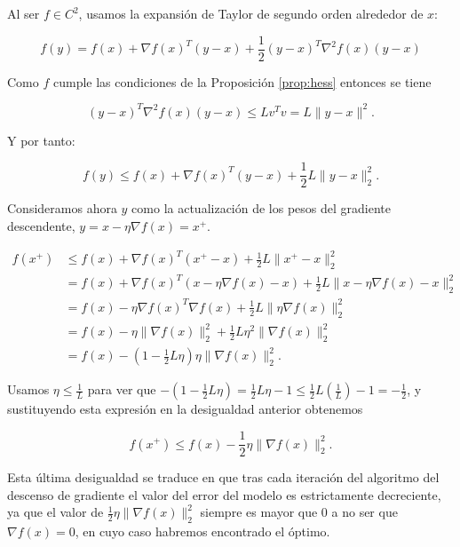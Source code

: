 Al ser $f \in C^2$, usamos la expansión de Taylor de segundo orden alrededor de $x$: 

\begin{equation*}
	f(y) = f(x) + \nabla f(x)^T (y-x) + \frac{1}{2} (y-x)^T \nabla^2 f(x) (y-x) 
\end{equation*}

Como $f$ cumple las condiciones de la Proposición \ref{prop:hess} entonces se tiene

\begin{equation*} 
	(y-x)^T\nabla ^2f(x)(y-x) \leq Lv^Tv = L \|y-x \|^2.
\end{equation*}

Y por tanto:

\begin{equation*}
    f(y) \leq f(x) + \nabla f(x)^T(y-x) + \frac{1}{2}L \|y - x \|^2_2.
\end{equation*}

Consideramos ahora $y$ como la actualización de los pesos del gradiente descendente, $y=x - \eta \nabla f(x)=x^+$. 


\begin{align*}
    f(x^+) &\leq f(x) + \nabla f(x)^T(x^+-x) + \frac{1}{2}L \|x^+ - x \|^2_2 \\
    &= f(x) + \nabla f(x)^T(x - \eta \nabla f(x) -x) + \frac{1}{2}L \|x - \eta \nabla f(x) - x \|^2_2 \\
    &= f(x) - \eta \nabla f(x)^T \nabla f(x) + \frac{1}{2} L \| \eta \nabla f(x) \|^2_2 \\
    &= f(x) - \eta \| \nabla f(x) \|^2_2 + \frac{1}{2} L \eta^2 \| \nabla f(x) \|^2_2 \\
    &= f(x) - (1- \frac{1}{2}L \eta) \eta \| \nabla f(x) \|^2_2.
\end{align*}

Usamos $\eta \leq \frac{1}{L}$ para ver que $-(1-\frac{1}{2}L \eta)= \frac{1}{2} L \eta - 1 \leq \frac{1}{2} L (\frac{1}{L}) - 1 = -\frac{1}{2}$, y sustituyendo esta expresión en la desigualdad anterior obtenemos 

\begin{equation}\label{eq:gdproof1}
	f(x^+) \leq f(x) - \frac{1}{2} \eta \| \nabla f(x) \|^2_2 .
\end{equation}

Esta última desigualdad se traduce en que tras cada iteración del algoritmo del descenso de gradiente el valor del error del modelo es estrictamente decreciente, ya que el valor de $\frac{1}{2} \eta \| \nabla f(x) \|^2_2$ siempre es mayor que 0 a no ser que $\nabla f(x)=0$, en cuyo caso habremos encontrado el óptimo. 

